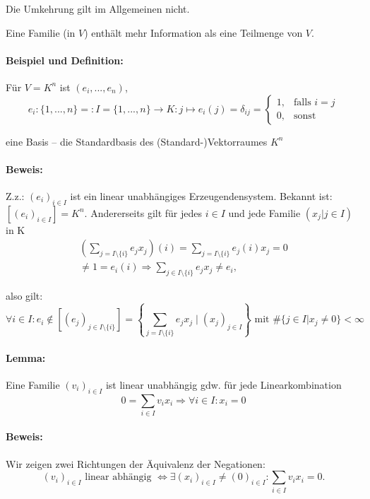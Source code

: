 	Die Umkehrung gilt im Allgemeinen nicht.

	Eine Familie (in $ V $) enthält mehr Information als eine Teilmenge von $ V $.
	
\paragraph{Beispiel und Definition:}
	Für $V = K^n$ ist $(e_i, ... , e_n)$,
	\begin{equation*}
		e_i:\{{1, ... ,n\}} =: I = \{1,...,n\} \to K: j\mapsto e_i(j)= \delta_{ij}=
		\begin{cases}
			1,& \text{falls } i=j\\
			0,& \text{sonst}
		\end{cases}
	\end{equation*}

	eine Basis -- die Standardbasis des (Standard-)Vektorraumes $K^n$

\paragraph{Beweis:}
	Z.z.: $ (e_i)_{i\in I} $ ist ein linear unabhängiges Erzeugendensystem. Bekannt ist: $ [(e_i)_{i\in I}] = K^n $. Andererseits gilt für jedes $i\in I$ und jede Familie $(x_j| j\in I)$ in K
	\begin{align*}
		(\sum_{j= I\setminus\{i\}}e_jx_j)(i) = \sum_{j=I\setminus\{i\}}e_j(i)x_j = 0\\
		\neq 1 = e_i(i) \Rightarrow \sum_{j\in I\setminus\{i\}} e_jx_j \neq e_i,
	\end{align*}
	
	also gilt:
	\begin{equation*}
	\forall i\in I: e_i \notin [(e_j)_{j\in I\setminus\{i\}}] = \left\{\sum_{j=I\setminus\{i\}} e_jx_j\mid (x_j)_{ j\in I}\right\} \text{ mit } \#\{j\in I| x_j \neq 0\}<\infty
	\end{equation*}
	
\paragraph{Lemma:}
	Eine Familie $(v_i)_{i\in I}$ ist linear unabhängig gdw. für jede Linearkombination
	\begin{equation*}
		0 = \sum_{i\in I} v_ix_i \Rightarrow \forall i\in I: x_i = 0
	\end{equation*}

\paragraph{Beweis:}
	Wir zeigen zwei Richtungen der Äquivalenz der Negationen: 
	\begin{equation*}
		(v_i)_{i\in I} \text{ linear abhängig } \Leftrightarrow \exists(x_i)_{i\in I} \neq (0)_{i\in I}: \sum_{i\in I} v_ix_i = 0.
	\end{equation*}

